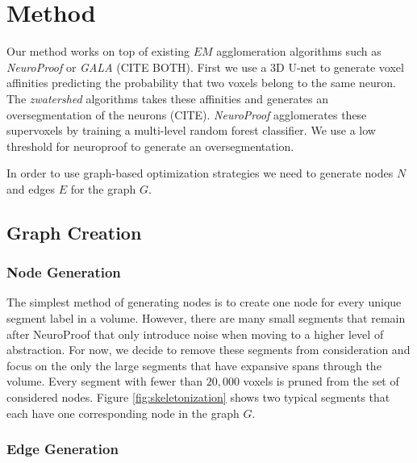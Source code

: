 \section{Method}

Our method works on top of existing $EM$ agglomeration algorithms such as \textit{NeuroProof} or \textit{GALA} (CITE BOTH). First we use a 3D U-net to generate voxel affinities predicting the probability that two voxels belong to the same neuron. The \textit{zwatershed} algorithms takes these affinities and generates an oversegmentation of the neurons (CITE). \textit{NeuroProof} agglomerates these supervoxels by training a multi-level random forest classifier. We use a low threshold for neuroproof to generate an oversegmentation. 

In order to use graph-based optimization strategies we need to generate nodes $N$ and edges $E$ for the graph $G$. 

\subsection{Graph Creation}

\subsubsection{Node Generation}

The simplest method of generating nodes is to create one node for every unique segment label in a volume. However, there are many small segments that remain after NeuroProof that only introduce noise when moving to a higher level of abstraction. For now, we decide to remove these segments from consideration and focus on the only the large segments that have expansive spans through the volume. Every segment with fewer than $20,000$ voxels is pruned from the set of considered nodes. Figure \ref{fig:skeletonization} shows two typical segments that each have one corresponding node in the graph $G$. 

\subsubsection{Edge Generation}

